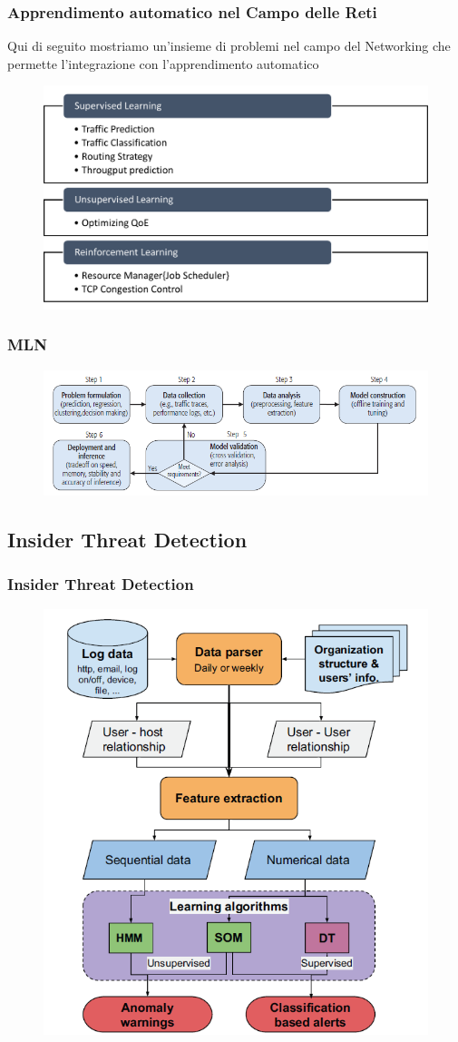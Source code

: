 \documentclass[xcolor=dvipsnames]{beamer}
\begin{document}
    \begin{frame}
    \frametitle{Apprendimento automatico nel Campo delle Reti} %
   Qui di seguito mostriamo un'insieme di problemi nel campo del Networking che permette l'integrazione con l'apprendimento automatico
   \begin{figure}[htbp]
        \includegraphics[width=.75\textwidth,height=.62\textheight]{RicercaMLNetworking.png}
    \end{figure}
\end{frame}

\begin{frame}
    \frametitle{MLN}
    \begin{figure}
        \includegraphics[width=.95\textwidth,height=.42\textheight]{WorkFlowNetworking.png}
    \end{figure}
    

\end{frame}
\subsection{Insider Threat Detection}
\begin{frame}
    \frametitle{Insider Threat Detection}
    \begin{figure}
        \includegraphics[width=.60\textwidth,height=.80\textheight]{workflowIntrusionThreat.png}
    \end{figure}
\end{frame}
\end{document}
